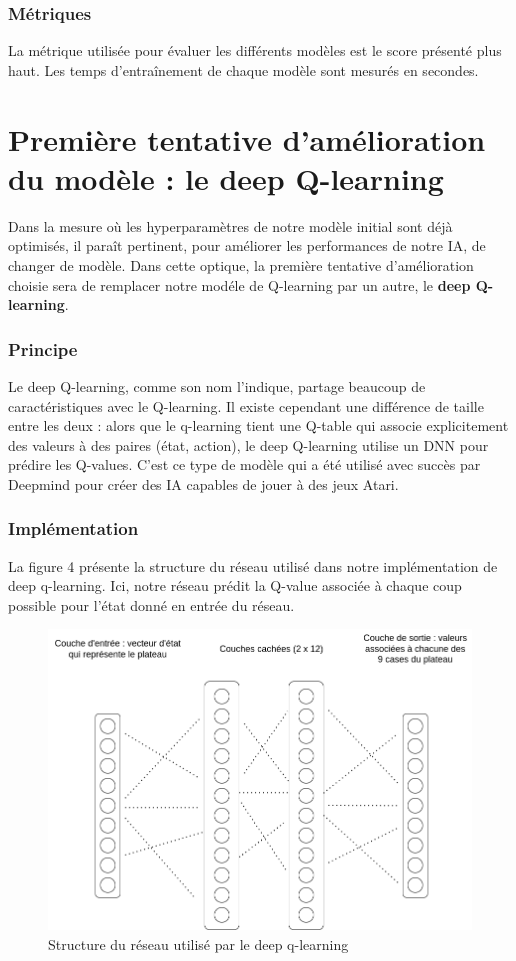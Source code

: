 \documentclass[french]{article}
\begin{document}
    \subsubsection{Métriques}

    La métrique utilisée pour évaluer les différents modèles est le score présenté plus haut. Les temps d'entraînement de chaque modèle sont mesurés en secondes. 

    \section{Première tentative d'amélioration du modèle : le deep Q-learning}

    Dans la mesure où les hyperparamètres de notre modèle initial sont déjà optimisés, il paraît pertinent, pour améliorer les performances de notre IA, de changer de modèle. Dans cette optique, la première tentative d'amélioration choisie sera de remplacer notre modéle de Q-learning par un autre, le \textbf{deep Q-learning}.
    \subsubsection{Principe}

    Le deep Q-learning, comme son nom l'indique, partage beaucoup de caractéristiques avec le Q-learning. Il existe cependant une différence de taille entre les deux : alors que le q-learning tient une Q-table qui associe explicitement des valeurs à des paires (état, action), le deep Q-learning utilise un DNN pour prédire les Q-values. C'est ce type de modèle qui a été utilisé avec succès par Deepmind pour créer des IA capables de jouer à des jeux Atari.


    \subsubsection{Implémentation}
    La figure 4 présente la structure du réseau utilisé dans notre implémentation de deep q-learning. Ici, notre réseau prédit la Q-value associée à chaque coup possible pour l'état donné en entrée du réseau.
    \begin{figure}[h]
        \includegraphics[width=13cm]{structure_dnn}
        \centering
        \caption{Structure du réseau utilisé par le deep q-learning}
        \centering
    \end{figure}
\end{document}
